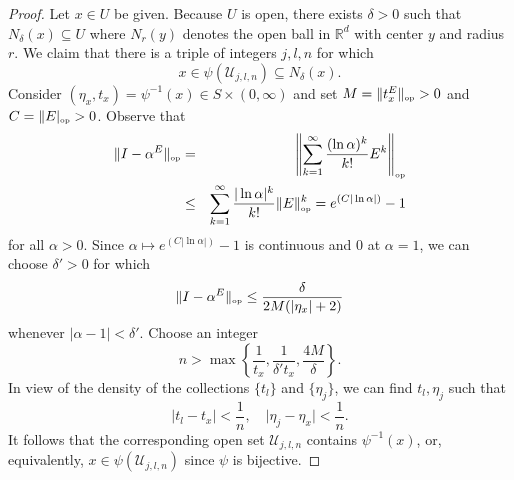 \documentclass[11pt]{article}
\theoremstyle{theorem}
\begin{document}
\begin{proof}
Let $x\in U$ be given. Because $U$ is open, there exists $\delta>0$ such that $N_{\delta}(x)\subseteq U$ where $N_r(y)$ denotes the open ball in $\mathbb{R}^d$ with center $y$ and radius $r$. We claim that there is a triple of integers $j,l,n$ for which
\begin{equation*}
x\in\psi(\mathcal{U}_{j,l,n})\subseteq N_\delta(x).
\end{equation*}
Consider $(\eta_x,t_x)=\psi^{-1}(x)\in S\times (0,\infty)$ and set $M=\|t_x^E\|_{\mbox{\tiny op}}>0$ and $C=\|E|_{\mbox{\tiny op}}>0$. Observe that 
\begin{eqnarray*}
\|I-\alpha^E\|_{\mbox{\tiny op}}&=&\left\|\sum_{k=1}^\infty \frac{(\ln \alpha)^k}{k!} E^k\right\|_{\mbox{\tiny op}}\\
&\leq &\sum_{k=1}^\infty \frac{|\ln \alpha|^k}{k!} \|E\|_{\mbox{\tiny op}}^k=e^{(C|\ln \alpha|)}-1
\end{eqnarray*}
for all $\alpha>0$. Since $\alpha\mapsto e^{(C|\ln \alpha|)}-1$ is continuous and $0$ at $\alpha=1$, we can choose $\delta'>0$ for which
\begin{equation*}
\|I-\alpha ^E\|_{\mbox{\tiny op}}\leq \frac{\delta}{2M (  |\eta_x|+2)}
\end{equation*}
whenever $|\alpha-1|<\delta'$. Choose an integer
\begin{equation*}
n>\max \left\{\frac{1}{t_x},\frac{1}{\delta't_x}, \frac{4 M }{\delta}\right\}.
\end{equation*}
In view of the density of the collections $\{t_l\}$ and $\{\eta_j\}$, we can find $t_l, \eta_j$ such that
\begin{equation*}
    \vert t_l - t_x \vert < \frac{1}{n},\quad \vert \eta_j - \eta_x \vert < \frac{1}{n}.
\end{equation*}
It follows that the corresponding open set $\mathcal{U}_{j,l,n}$ contains $\psi^{-1}(x)$, or, equivalently, $x\in \psi(\mathcal{U}_{j,l,n})$ since $\psi$ is bijective. 


\end{proof}
\end{document}
